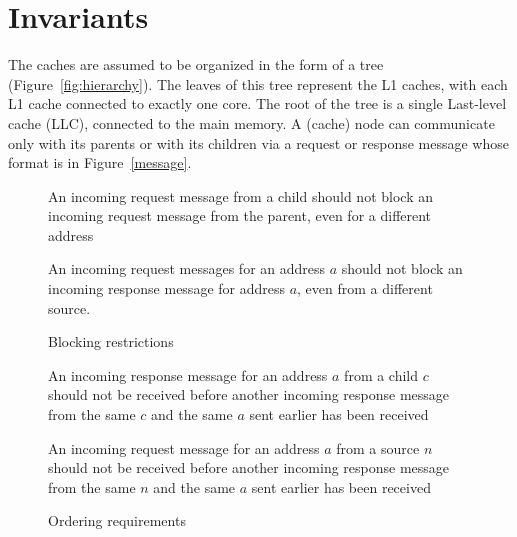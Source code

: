 \section{Invariants}
\label{sec:invariants}


The caches are assumed to be organized in the form of a tree
(Figure~\ref{fig:hierarchy}). The leaves of this tree represent the L1 caches,
with each L1 cache connected to exactly one core. The root of the tree is a
single Last-level cache (LLC), connected to the main memory. A (cache) node can
communicate only with its parents or with its children via a request or
response message whose format is in Figure~\ref{message}.

\begin{figure}
\begin{inv}
An incoming request message from a child should not block an incoming request
message from the parent, even for a different address\label{cReqNoBlockPReq}
\end{inv}
\begin{inv}
An incoming request messages for an address $a$ should not block an incoming
response message for address $a$, even from a different
source.\label{reqNoBlockReq}
\end{inv}
\caption{Blocking restrictions}
\label{blocking}
\end{figure}

\begin{figure}
\begin{inv}
An incoming response message for an address $a$ from a child $c$ should not be
received before another incoming response message from the same $c$ and the
same $a$ sent earlier has been received\label{cRespFifo}
\end{inv}
\begin{inv}
An incoming request message for an address $a$ from a source $n$ should not be
received before another incoming response message from the same $n$ and the
same $a$ sent earlier has been received\label{reqNoOvertakeResp}
\end{inv}
\caption{Ordering requirements}
\label{order}
\end{figure}

